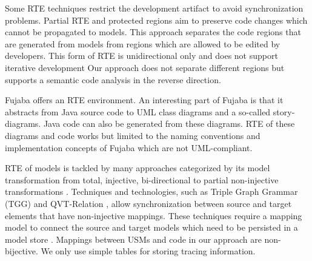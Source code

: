 Some RTE techniques restrict the development artifact to avoid synchronization problems.
Partial RTE and protected regions \cite{Frankel:2002:MDA:579151} aim to preserve code changes which cannot be propagated to models.
This approach separates the code regions that are generated from models
from regions which are allowed to be edited by developers. 
This form of RTE is unidirectional only and does not support iterative development \cite{Jorges2013}
Our approach does not separate different regions but supports a semantic code analysis in the reverse direction.

Fujaba \cite{KNNZ99_2_ag} offers an RTE environment. An interesting part of Fujaba is that it abstracts from Java source code to UML class diagrams and a so-called story-diagrams. Java code can also be generated from these diagrams. RTE of these diagrams and code works but limited to the naming conventions and implementation concepts of Fujaba which are not UML-compliant. 

\noindent
{}

RTE of models is tackled by many approaches categorized by its model transformation from total, injective, bi-directional to partial non-injective transformations \cite{Hettel2008}. %
Techniques and technologies, such as Triple Graph Grammar (TGG) \cite{giese_incremental_2006}
and QVT-Relation \cite{Omg2008},
allow synchronization between source and target elements that have non-injective mappings.
These techniques require a mapping model to connect the source and target models which need to be persisted in a model store \cite{Bergmann2011}.
Mappings between USMs and code in our approach are non-bijective. We only use simple tables for storing tracing information.

 


